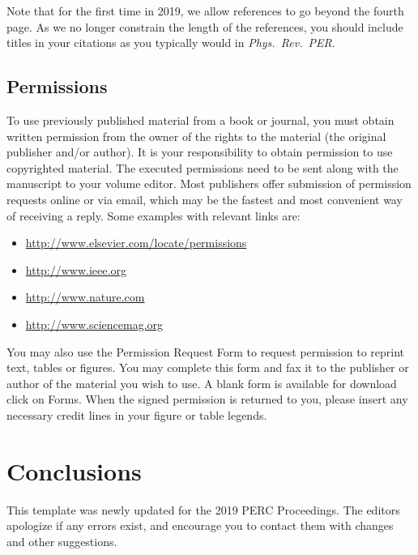 \documentclass[english,aps,prstper,reprint,showpacs,titlepage,longbibliography]{revtex4-2}
\begin{document}
Note that for the first time in 2019, we allow references to go beyond the fourth page.  As we
no longer constrain the length of the references, you should include titles in your citations
as you typically would in \textit{Phys.\ Rev.\ PER}.

\subsection{Permissions}
To use previously published material from a book or journal, you must obtain written permission
from the owner of the rights to the material (the original publisher and/or author). It is your
responsibility to obtain permission to use copyrighted material. The executed permissions need
to be sent along with the manuscript to your volume editor. Most publishers offer submission of
permission requests online or via email, which may be the fastest and most convenient way of
receiving a reply. Some examples with relevant links are:

\begin{itemize}
  \item \url{http://www.elsevier.com/locate/permissions}
  \item \url{http://www.ieee.org}
  \item \url{http://www.nature.com}
  \item \url{http://www.sciencemag.org}
\end{itemize}

You may also use the Permission Request Form to request permission to reprint text, tables or
figures. You may complete this form and fax it to the publisher or author of the material you
wish to use. A blank form is available for download click on Forms. When the signed permission
is returned to you, please insert any necessary credit lines in your figure or table legends.


\section{Conclusions}
This template was newly updated for the 2019 PERC Proceedings.  The editors apologize if any
errors exist, and encourage you to contact them with changes and other suggestions.


\end{document}

